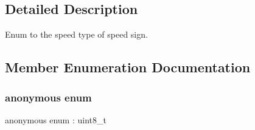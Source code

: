 \subsection{Detailed Description}
Enum to the speed type of speed sign. 

\subsection{Member Enumeration Documentation}
\mbox{\label{structmaf__perception__interface_1_1SpeedSignTypeEnum_afc86be0b24f97e8605903ea0f2e21cad}} 
\subsubsection{\texorpdfstring{anonymous enum}{anonymous enum}}
{\footnotesize\ttfamily anonymous enum \+: uint8\+\_\+t}


